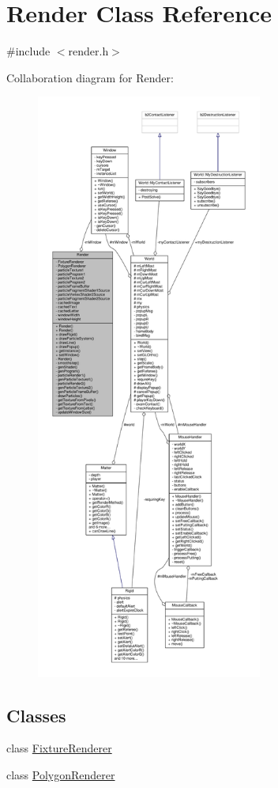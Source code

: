 \hypertarget{classRender}{}\section{Render Class Reference}
\label{classRender}


{\ttfamily \#include $<$render.\+h$>$}



Collaboration diagram for Render\+:
\nopagebreak
\begin{figure}[H]
\begin{center}
\leavevmode
\includegraphics[height=550pt]{classRender__coll__graph}
\end{center}
\end{figure}
\subsection*{Classes}
\begin{DoxyCompactItemize}
\item 
class \hyperlink{classRender_1_1FixtureRenderer}{Fixture\+Renderer}
\item 
class \hyperlink{classRender_1_1PolygonRenderer}{Polygon\+Renderer}
\end{DoxyCompactItemize}
